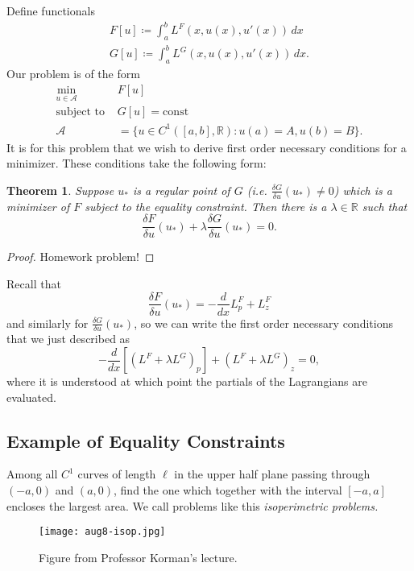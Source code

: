 \documentclass[11pt]{article}
\newcommand{\R}{\mathbb{R}}
\newtheorem{theorem}{Theorem}[subsection]
\begin{document}
Define functionals
\begin{align*}
F[u] \coloneqq \int_a^b L^F(x, u(x), u'(x)) \, dx \\
G[u] \coloneqq \int_a^b L^G(x, u(x), u'(x)) \, dx.
\end{align*}
Our problem is of the form
\begin{align*}
\min_{u \in \mathcal{A}} \qquad &F[u] \\
\text{subject to } &G[u] = \mathrm{const} \\
\mathcal{A} &= \{ u \in C^1([a, b], \R) : u(a) = A, u(b) = B \}.
\end{align*}
It is for this problem that we wish to derive first order necessary conditions for a minimizer. These conditions take the following form:
\begin{theorem}
Suppose $u_*$ is a \emph{regular point} of $G$ (i.e. $\frac{\delta G}{\delta u}(u_*) \neq 0$) which is a minimizer of $F$ subject to the equality constraint. Then there is a $\lambda \in \R$ such that
\[
\frac{\delta F}{\delta u}(u_*) + \lambda \frac{\delta G}{\delta u}(u_*) = 0.
\]
\end{theorem}
\begin{proof}
Homework problem!
\end{proof}

Recall that
\[
\frac{\delta F}{\delta u}(u_*) = -\frac{d}{dx} L_p^F + L_z^F
\]
and similarly for $\frac{\delta G}{\delta u}(u_*)$, so we can write the first order necessary conditions that we just described as
\[
-\frac{d}{dx} \left[ (L^F + \lambda L^G)_p \right] + \left( L^F + \lambda L^G \right)_z = 0,
\]
where it is understood at which point the partials of the Lagrangians are evaluated.

\subsection{Example of Equality Constraints}

Among all $C^1$ curves of length $\ell$ in the upper half plane passing through $(-a,0)$ and $(a, 0)$, find the one which together with the interval $[-a,a]$ encloses the largest area. We call problems like this \emph{isoperimetric problems.}

\begin{figure}[H]
\texttt{[image: aug8-isop.jpg]}
\centering
\caption{Figure from Professor Korman's lecture.}
\end{figure}
\end{document}
